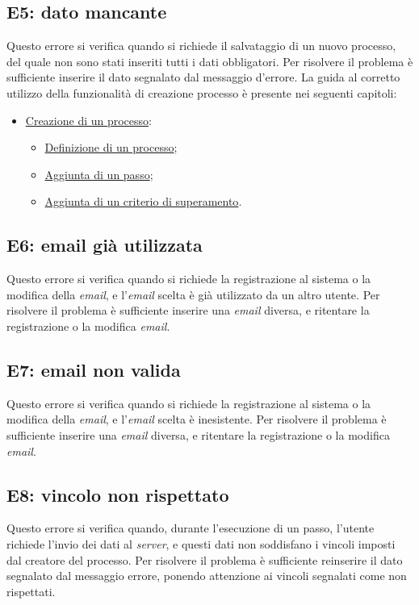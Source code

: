 \subsection{E5: dato mancante}
\label{e5}
Questo errore si verifica quando si richiede il salvataggio di un nuovo processo, del quale non sono stati inseriti tutti i dati obbligatori.
Per risolvere il problema è sufficiente inserire il dato segnalato dal messaggio d'errore.
La guida al corretto utilizzo della funzionalità di creazione processo è presente nei seguenti capitoli:
\begin{itemize}
\item \hyperref[creazione]{Creazione di un processo}:
\begin{itemize}
\item \hyperref[definizione]{Definizione di un processo};
\item \hyperref[addstep]{Aggiunta di un passo};
\item \hyperref[vincoli]{Aggiunta di un criterio di superamento}.
\end{itemize}
\end{itemize}

\subsection{E6: email già utilizzata}
\label{e6}
Questo errore si verifica quando si richiede la registrazione al sistema o la modifica della \textit{email}, e l'\textit{email} scelta è già utilizzato da un altro utente.
Per risolvere il problema è sufficiente inserire una \textit{email} diversa, e ritentare la registrazione o la modifica \textit{email}.

\subsection{E7: email non valida}
\label{e7}
Questo errore si verifica quando si richiede la registrazione al sistema o la modifica della \textit{email}, e l'\textit{email} scelta è inesistente.
Per risolvere il problema è sufficiente inserire una \textit{email} diversa, e ritentare la registrazione o la modifica \textit{email}.

\subsection{E8: vincolo non rispettato}
\label{e8}
Questo errore si verifica quando, durante l'esecuzione di un passo, l'utente richiede l'invio dei dati al \textit{server}, e questi dati non soddisfano i vincoli imposti dal creatore del processo.
Per risolvere il problema è sufficiente reinserire il dato segnalato dal messaggio errore, ponendo attenzione ai vincoli segnalati come non rispettati.